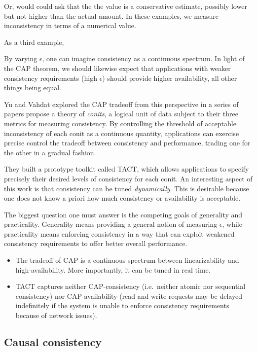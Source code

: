 \documentclass[]             %
{NASA}                       %
\theoremstyle{definition}
\begin{document}
Or, would could ask that the the value is a conservative estimate,
possibly lower but not higher than the actual amount. In these examples,
we measure inconsistency in terms of a numerical value.

As a third example,

By varying \(\epsilon\), one can imagine consistency as a continuous
spectrum. In light of the CAP theorem, we should likewise expect that
applications with weaker consistency requirements (high \(\epsilon\))
should provide higher availability, all other things being equal.

Yu and Vahdat explored the CAP tradeoff from this perspective in a
series of papers \cite{2000tact,2000tactalgorithms,10.5555/1251229.1251250,DBLP:conf/icdcs/YuV01,2002tact}
propose a theory of \emph{conits}, a logical unit of data subject to
their three metrics for measuring consistency. By controlling the
threshold of acceptable inconsistency of each conit as a continuous
quantity, applications can exercise precise control the tradeoff between
consistency and performance, trading one for the other in a gradual
fashion.

They built a prototype toolkit called TACT, which allows applications to
specify precisely their desired levels of consistency for each conit. An
interesting aspect of this work is that consistency can be tuned
\emph{dynamically}. This is desirable because one does not know a priori
how much consistency or availability is acceptable.

The biggest question one must answer is the competing goals of
generality and practicality. Generality means providing a general notion
of measuring \(\epsilon\), while practicality means enforcing
consistency in a way that can exploit weakened consistency requirements
to offer better overall performance.

\begin{itemize}
\item
  The tradeoff of CAP is a continuous spectrum between linearizability
  and high-availability. More importantly, it can be tuned in real time.
\item
  TACT captures neither CAP-consistency (i.e.~neither atomic nor
  sequential consistency) nor CAP-availability (read and write requests
  may be delayed indefinitely if the system is unable to enforce
  consistency requirements because of network issues).
\end{itemize}

\hypertarget{causal-consistency-1}{%
  \subsection{Causal consistency}\label{causal-consistency-1}}
\end{document}
